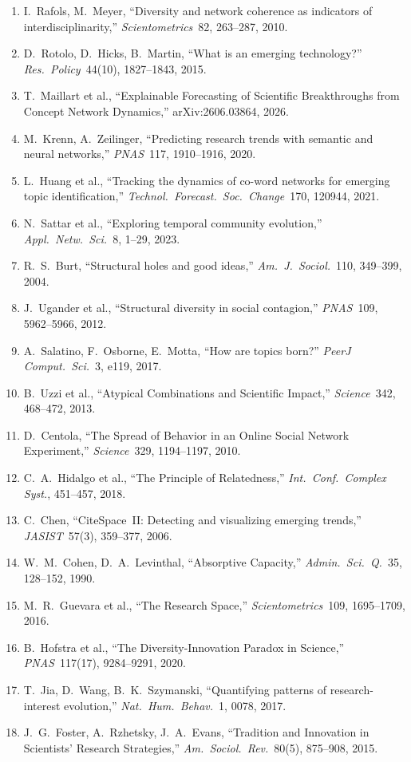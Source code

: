 \documentclass[11pt,letterpaper]{article}
\begin{document}
\begin{enumerate}
\item I.\ Rafols, M.\ Meyer, ``Diversity and network coherence as indicators of interdisciplinarity,'' \emph{Scientometrics}\ 82, 263--287, 2010.
\item D.\ Rotolo, D.\ Hicks, B.\ Martin, ``What is an emerging technology?'' \emph{Res.\ Policy}\ 44(10), 1827--1843, 2015.
\item T.\ Maillart et al., ``Explainable Forecasting of Scientific Breakthroughs from Concept Network Dynamics,'' arXiv:2606.03864, 2026.
\item M.\ Krenn, A.\ Zeilinger, ``Predicting research trends with semantic and neural networks,'' \emph{PNAS}\ 117, 1910--1916, 2020.
\item L.\ Huang et al., ``Tracking the dynamics of co-word networks for emerging topic identification,'' \emph{Technol.\ Forecast.\ Soc.\ Change}\ 170, 120944, 2021.
\item N.\ Sattar et al., ``Exploring temporal community evolution,'' \emph{Appl.\ Netw.\ Sci.}\ 8, 1--29, 2023.
\item R.\ S.\ Burt, ``Structural holes and good ideas,'' \emph{Am.\ J.\ Sociol.}\ 110, 349--399, 2004.
\item J.\ Ugander et al., ``Structural diversity in social contagion,'' \emph{PNAS}\ 109, 5962--5966, 2012.
\item A.\ Salatino, F.\ Osborne, E.\ Motta, ``How are topics born?'' \emph{PeerJ Comput.\ Sci.}\ 3, e119, 2017.
\item B.\ Uzzi et al., ``Atypical Combinations and Scientific Impact,'' \emph{Science}\ 342, 468--472, 2013.
\item D.\ Centola, ``The Spread of Behavior in an Online Social Network Experiment,'' \emph{Science}\ 329, 1194--1197, 2010.
\item C.\ A.\ Hidalgo et al., ``The Principle of Relatedness,'' \emph{Int.\ Conf.\ Complex Syst.}, 451--457, 2018.
\item C.\ Chen, ``CiteSpace~II: Detecting and visualizing emerging trends,'' \emph{JASIST}\ 57(3), 359--377, 2006.
\item W.\ M.\ Cohen, D.\ A.\ Levinthal, ``Absorptive Capacity,'' \emph{Admin.\ Sci.\ Q.}\ 35, 128--152, 1990.
\item M.\ R.\ Guevara et al., ``The Research Space,'' \emph{Scientometrics}\ 109, 1695--1709, 2016.
\item B.\ Hofstra et al., ``The Diversity-Innovation Paradox in Science,'' \emph{PNAS}\ 117(17), 9284--9291, 2020.
\item T.\ Jia, D.\ Wang, B.\ K.\ Szymanski, ``Quantifying patterns of research-interest evolution,'' \emph{Nat.\ Hum.\ Behav.}\ 1, 0078, 2017.
\item J.\ G.\ Foster, A.\ Rzhetsky, J.\ A.\ Evans, ``Tradition and Innovation in Scientists' Research Strategies,'' \emph{Am.\ Sociol.\ Rev.}\ 80(5), 875--908, 2015.
\end{enumerate}
\end{document}
